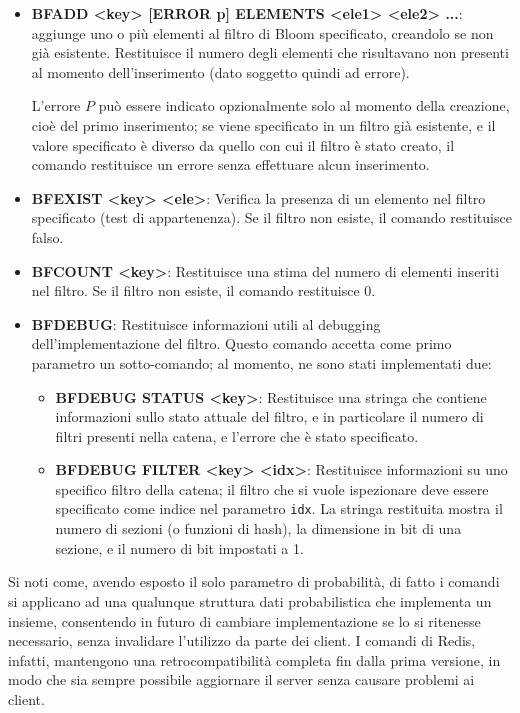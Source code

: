 \begin{itemize}
	\medskip
	\item \textbf{BFADD <key> [ERROR p] ELEMENTS <ele1> <ele2> ...}: aggiunge uno o più elementi al
	filtro di Bloom specificato, creandolo se non già esistente. Restituisce il numero degli
	elementi che risultavano non presenti al momento dell'inserimento (dato soggetto quindi ad
	errore).

	L'errore $P$ può essere indicato opzionalmente solo al momento della creazione, cioè del primo
	inserimento; se viene specificato in un filtro già esistente, e il valore specificato è diverso
	da quello con cui il filtro è stato creato, il comando restituisce un errore senza effettuare
	alcun inserimento.

	\item \textbf{BFEXIST <key> <ele>}: Verifica la presenza di un elemento nel filtro specificato
	(test di appartenenza). Se il filtro non esiste, il comando restituisce falso.

	\item \textbf{BFCOUNT <key>}: Restituisce una stima del numero di elementi inseriti nel filtro.
	Se il filtro non esiste, il comando restituisce $0$.

	\item \textbf{BFDEBUG}: Restituisce informazioni utili al debugging dell'implementazione del
	filtro. Questo comando accetta come primo parametro un sotto-comando; al momento, ne sono stati
	implementati due:

		\begin{itemize}
		\item \textbf{BFDEBUG STATUS <key>}: Restituisce una stringa che contiene informazioni sullo
		stato attuale del filtro, e in particolare il numero di filtri presenti nella catena, e
		l'errore che è stato specificato.

		\item \textbf{BFDEBUG FILTER <key> <idx>}: Restituisce informazioni su uno specifico filtro
		della catena; il filtro che si vuole ispezionare deve essere specificato come indice 
		nel parametro \verb|idx|. La stringa restituita mostra il numero di sezioni (o funzioni
		di hash), la dimensione in bit di una sezione, e il numero di bit impostati a 1.
		\end{itemize}

\end{itemize}

Si noti come, avendo esposto il solo parametro di probabilità, di fatto i comandi si applicano ad
una qualunque struttura dati probabilistica che implementa un insieme, consentendo in futuro di
cambiare implementazione se lo si ritenesse necessario, senza invalidare l'utilizzo da parte dei
client. I comandi di Redis, infatti, mantengono una retrocompatibilità completa fin dalla prima
versione, in modo che sia sempre possibile aggiornare il server senza causare problemi ai client.


